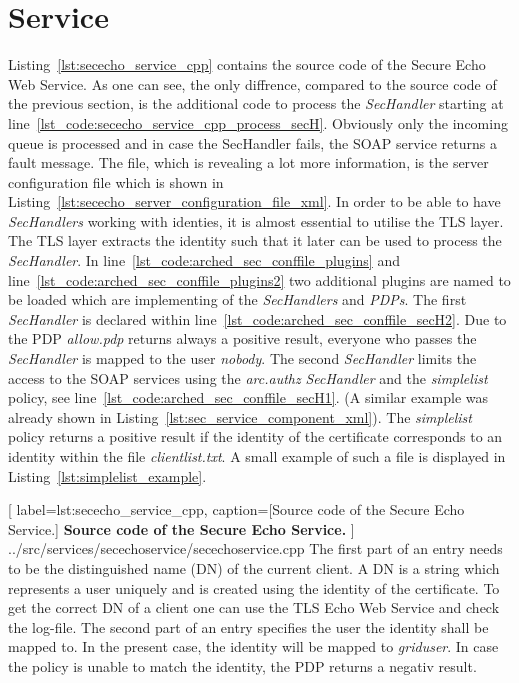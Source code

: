 \section{Service}

Listing~\ref{lst:sececho_service_cpp} contains the source code of the Secure Echo Web Service. As one can see, the only diffrence, compared to the source code of the previous section, is the additional code to process the \textit{SecHandler} starting at line~\ref{lst_code:sececho_service_cpp_process_secH}. Obviously only the incoming queue is processed and in case the SecHandler fails, the SOAP service returns a fault message. The file, which is revealing a lot more information, is the server configuration file which is shown in Listing~\ref{lst:sececho_server_configuration_file_xml}. 
In order to be able to have \textit{SecHandlers} working with identies, it is almost essential to utilise the TLS layer.
The TLS layer extracts the identity such that it later can be used to process the \textit{SecHandler}.
In line~\ref{lst_code:arched_sec_conffile_plugins} and line~\ref{lst_code:arched_sec_conffile_plugins2} two additional plugins 
are named to be loaded which are implementing of the \textit{SecHandlers} and \textit{PDPs}.
%
%
The first \textit{SecHandler} is declared within line~\ref{lst_code:arched_sec_conffile_secH2}. 
Due to the PDP \textit{allow.pdp} returns always a positive result, everyone who passes the \textit{SecHandler} is mapped to the user \textit{nobody}. 
%
%
The second \textit{SecHandler} limits the access to the SOAP services using the \textit{arc.authz} \textit{SecHandler} and the \textit{simplelist} policy, see line~\ref{lst_code:arched_sec_conffile_secH1}. (A similar example was already shown in Listing~\ref{lst:sec_service_component_xml}). The \textit{simplelist} policy returns a positive result if the identity of the certificate corresponds to an identity within the file \textit{clientlist.txt}. A small example of such a file is displayed in Listing~\ref{lst:simplelist_example}.

	[
	label=lst:sececho_service_cpp,
	caption={[Source code of the Secure Echo Service.]
	\textbf{Source code of the Secure Echo Service.}}
	]
{../src/services/secechoservice/secechoservice.cpp}
%
%
The first part of an entry needs to be the distinguished name (DN) of the current client. A DN is a string which represents a user uniquely and is created using the identity of the certificate. To get the correct DN of a client one can use the TLS Echo Web Service and check the log-file. The second part of an entry specifies the user the identity shall be mapped to. In the present case, the identity will be mapped to \textit{griduser}. In case the policy is unable to match the identity, the PDP returns a negativ result.
